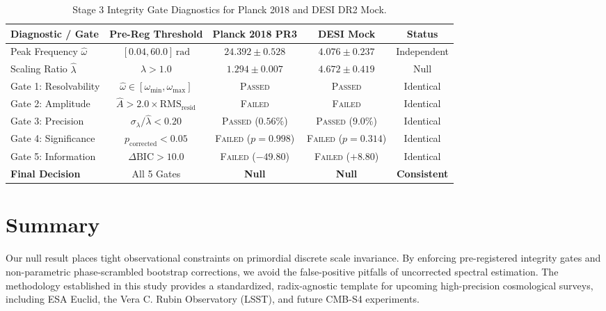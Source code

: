 \begin{table}[h]
\centering
\small
\caption{Stage 3 Integrity Gate Diagnostics for Planck 2018 and DESI DR2 Mock.}
\label{tab:gates_ch1}
\begin{tabular}{lcccc}
\toprule
\textbf{Diagnostic / Gate} & \textbf{Pre-Reg Threshold} & \textbf{Planck 2018 PR3} & \textbf{DESI Mock} & \textbf{Status} \\
\midrule
Peak Frequency $\hat\omega$ & $[0.04, 60.0]\,\mathrm{rad}$ & $24.392 \pm 0.528$ & $4.076 \pm 0.237$ & Independent \\
Scaling Ratio $\hat\lambda$ & $\lambda > 1.0$ & $1.294 \pm 0.007$ & $4.672 \pm 0.419$ & Null \\
Gate 1: Resolvability & $\hat\omega \in [\omega_{\min}, \omega_{\max}]$ & \textsc{Passed} & \textsc{Passed} & Identical \\
Gate 2: Amplitude & $\hat A > 2.0 \times \mathrm{RMS}_{\mathrm{resid}}$ & \textsc{Failed} & \textsc{Failed} & Identical \\
Gate 3: Precision & $\sigma_\lambda / \hat\lambda < 0.20$ & \textsc{Passed} ($0.56\%$) & \textsc{Passed} ($9.0\%$) & Identical \\
Gate 4: Significance & $p_{\mathrm{corrected}} < 0.05$ & \textsc{Failed} ($p=0.998$) & \textsc{Failed} ($p=0.314$) & Identical \\
Gate 5: Information & $\Delta\mathrm{BIC} > 10.0$ & \textsc{Failed} ($-49.80$) & \textsc{Failed} ($+8.80$) & Identical \\
\midrule
\textbf{Final Decision} & All 5 Gates & \textbf{Null} & \textbf{Null} & \textbf{Consistent} \\
\bottomrule
\end{tabular}
\end{table}

\section{Summary}
Our null result places tight observational constraints on primordial discrete scale invariance. By enforcing pre-registered integrity gates and non-parametric phase-scrambled bootstrap corrections, we avoid the false-positive pitfalls of uncorrected spectral estimation. The methodology established in this study provides a standardized, radix-agnostic template for upcoming high-precision cosmological surveys, including ESA Euclid, the Vera C. Rubin Observatory (LSST), and future CMB-S4 experiments.
